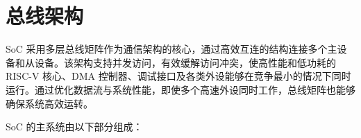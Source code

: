 \documentclass[main\_\_CN.tex]{subfiles}
\begin{document}
\setchineseformatting


\ifglobal
\else
    \clearpage
    \listoftodos
    \listofdonetodos
    \tableofcontents
\fi



\hypertarget{busarch}{}
\chapter{总线架构}
\label{mod:busarch}

\chipname{} SoC 采用多层总线矩阵作为通信架构的核心，通过高效互连的结构连接多个主设备和从设备。该架构支持并发访问，有效缓解访问冲突，使高性能和低功耗的 RISC-V 核心、DMA 控制器、调试接口及各类外设能够在竞争最小的情况下同时运行。通过优化数据流与系统性能，即使多个高速外设同时工作，总线矩阵也能够确保系统高效运转。



\chipname{} SoC 的主系统由以下部分组成：
\end{document}

